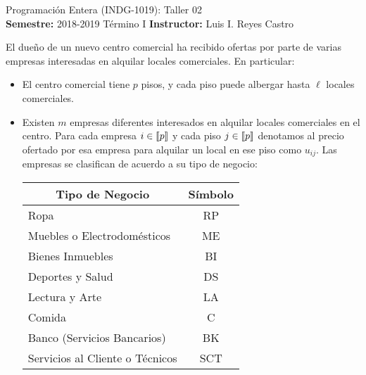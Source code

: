 \documentclass[ a4paper, twoside, 11pt]{article}
\newcommand{\numero}{02}
\begin{document}
\allowdisplaybreaks



\begin{center}
\Large Programaci\'on Entera (INDG-1019): Taller \numero \\[1ex]
\small \textbf{Semestre:} 2018-2019 T\'ermino I \qquad
\textbf{Instructor:} Luis I. Reyes Castro
\end{center}
\fullskip

\begin{problem}
El due\~no de un nuevo centro comercial ha recibido ofertas por parte de varias empresas interesadas en alquilar locales comerciales. En particular: 
\begin{itemize}
\item El centro comercial tiene $p$ pisos, y cada piso puede albergar hasta $\ell$ locales comerciales. 
\item Existen $m$ empresas diferentes interesados en alquilar locales comerciales en el centro. Para cada empresa $i \in \llbracket p \rrbracket$ y cada piso $j \in \llbracket p \rrbracket$ denotamos al precio ofertado por esa empresa para alquilar un local en ese piso como $u_{ij}$. Las empresas se clasifican de acuerdo a su tipo de negocio: 

\begin{table}[htb]
\centering
\begin{tabular}{|l|c|}
\hline
\multicolumn{1}{|c|}{\textbf{Tipo de Negocio}} & \textbf{S\'imbolo} \\ \hline
Ropa                                           & RP                 \\ \hline
Muebles o Electrodom\'esticos                  & ME                 \\ \hline
Bienes Inmuebles                               & BI                 \\ \hline
Deportes y Salud                               & DS                 \\ \hline
Lectura y Arte                                 & LA                 \\ \hline
Comida                                         & C                  \\ \hline
Banco (Servicios Bancarios)                    & BK                 \\ \hline
Servicios al Cliente o T\'ecnicos              & SCT                \\ \hline
\end{tabular}
\end{table}


\end{itemize}
\end{problem}
\end{document}
